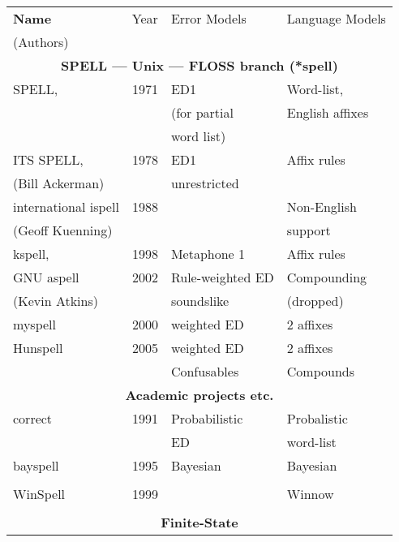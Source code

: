 \documentclass[officiallayout,final]{unihelcompling}
\begin{document}
\begin{longtable}{|l|r|l|l|}
        \hline
        \bf Name & Year & Error Models & Language Models \\
(Authors)        &      &              & \\
        \hline
        \multicolumn{4}{|c|}{\bf SPELL --- Unix --- FLOSS branch (*spell) }\\
        \hline
             SPELL,            & 1971 & ED1          & Word-list,    \\
        \citep{gorin1971spell} &      & (for partial & English affixes \\
                               &      &  word list)  &              \\
        ITS SPELL,             & 1978 & ED1          & Affix rules \\
     (Bill Ackerman)           &      & unrestricted &  \\
        international ispell   & 1988 &              & Non-English \\
              (Geoff Kuenning) &      &              & support \\
        \hline
        kspell,                & 1998 & Metaphone 1 & Affix rules \\
        GNU aspell             & 2002 & Rule-weighted ED & Compounding \\
    (Kevin Atkins)             &      & soundslike & (dropped)  \\
        \hline
        myspell & 2000 & weighted ED & 2 affixes \\
        \hline
        Hunspell & 2005 & weighted ED & 2 affixes  \\
                 &      & Confusables & Compounds  \\
        \hline
        \multicolumn{4}{|c|}{\bf Academic projects etc.} \\
        \hline
        correct & 1991 & Probabilistic & Probalistic \\
        \citep{church1991probability} & & ED & word-list \\
        \hline
        bayspell  & 1995 & Bayesian & Bayesian \\
        \citep{golding1995bayesian} & & & \\
        \hline
        WinSpell & 1999 & & Winnow \\
        \citep{golding1999winnow} & & & \\
        \hline
        \multicolumn{4}{|c|}{\bf Finite-State} \\

\end{longtable}
\end{document}
